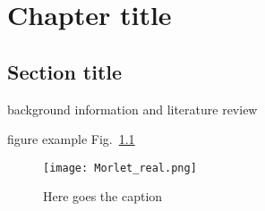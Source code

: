
\chapter{Chapter title} %
\label{Chapter1} %

\section{Section title} %
%

background information and literature review \cite{ffowcs:63}

figure example Fig.~\ref{f:example}
\begin{figure}[h!]
    \centering
    \texttt{[image: Morlet\_real.png]}
    \caption{Here goes the caption}
    \label{f:example}
\end{figure}
